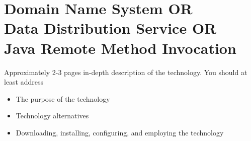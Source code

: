 \documentclass[Preamble]{subfiles}
\begin{document}
\chapter{Domain Name System OR\\
Data Distribution Service OR\\
Java Remote Method Invocation}
Approximately 2-3 pages in-depth description of the technology. You
should at least address
\begin{itemize}
\item The purpose of the technology
\item Technology alternatives
\item Downloading, installing, configuring, and employing the technology
\end{itemize}
\end{document}

